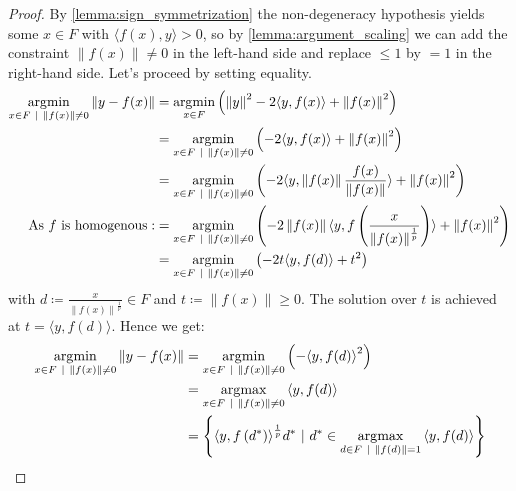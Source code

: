 \begin{proof}

By \autoref{lemma:sign_symmetrization} the non-degeneracy hypothesis yields
some \(x \in F\) with \({\langle f(x),y\rangle} > 0\), so by
\autoref{lemma:argument_scaling} we can add the constraint
\(\left\| {f(x)} \right\| \neq 0\) in the left-hand side and replace
\(\leq 1\) by \(= 1\) in the right-hand side. Let's proceed by setting
equality. \[\begin{aligned}
\operatorname*{\arg\!\min}_{x \in F~|~\left\| {f(x)} \right\| \neq 0}\left\| {y - f(x)} \right\| & = \operatorname*{\arg\!\min}_{x \in F}\left( \left\| y \right\|^{2} - 2{\langle y,f(x)\rangle}+ \left\| {f(x)} \right\|^{2}  \right) \\
 & = \operatorname*{\arg\!\min}_{x \in F~|~\left\| {f(x)} \right\| \neq 0}\left( - 2{\langle y,f(x)\rangle} + \left\| {f(x)} \right\|^{2} \right) \\
 & = \operatorname*{\arg\!\min}_{x \in F~|~\left\| {f(x)} \right\| \neq 0}\left( - 2{\langle y,\left\| {f(x)} \right\|\frac{f(x)}{\left\| {f(x)} \right\|}\rangle} + \left\| {f(x)} \right\|^{2} \right) \\
\text{As}\ f\ \text{is}\ \text{homogenous}: & = \operatorname*{\arg\!\min}_{x \in F~|~\left\| {f(x)} \right\| \neq 0}\left( - 2\left\| {f(x)} \right\|{\langle y,f\left( \frac{x}{\left\| {f(x)} \right\|^{\frac{1}{p}}} \right)\rangle} + \left\| {f(x)} \right\|^{2} \right) \\
 & = \operatorname*{\arg\!\min}_{x \in F~|~\left\| {f(x)} \right\| \neq 0}\left( - 2t{\langle y,f(d)\rangle} + t^{2} \right)
\end{aligned}\] with
\(d \coloneqq \frac{x}{\left\| {f(x)} \right\|^{\frac{1}{p}}} \in F\)
and \(t \coloneqq \left\| {f(x)} \right\| \geq 0\). The solution over
\(t\) is achieved at \(t = {\langle y,f(d)\rangle}\). Hence we get:
\[\begin{aligned}
\operatorname*{\arg\!\min}_{x \in F~|~\left\| {f(x)} \right\| \neq 0}\left\| {y - f(x)} \right\| & = \operatorname*{\arg\!\min}_{x \in F~|~\left\| {f(x)} \right\| \neq 0}\left( - {\langle y,f(d)\rangle}^{2} \right) \\
 & = \operatorname*{\arg\!\max}_{x \in F~|~\left\| {f(x)} \right\| \neq 0}{\langle y,f(d)\rangle} \\
 & = \left\{ {\langle y,f\left( d^{\ast} \right)\rangle}^{\frac{1}{p}}d^{\ast}~|~d^{\ast} \in \operatorname*{\arg\!\max}_{d \in F~|~\left\| {f(d)} \right\| = 1}{\langle y,f(d)\rangle} \right\}
\end{aligned}\]

\end{proof}

